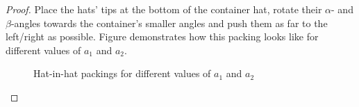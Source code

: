 \documentclass[%
    a4paper,              %
    style=screen,          %
    bibliography=totoc,   %
    nexus,                %
    lnum,                 %
    extramargin,          %
]{tubsbook}
\newcommand\defaulta{30}
\newcommand\defaultb{40}
\begin{document}
\begin{proof}
    Place the hats' tips at the bottom of the container hat, rotate their $\alpha$- and $\beta$-angles towards the container's smaller angles and push them as far to the left/right as possible. Figure  demonstrates how this packing looks like for different values of $a_1$ and $a_2$.

    \begin{figure}[htbp!]
        \centering


        \vspace{5mm}


        \vspace{5mm}


        \vspace{5mm}


        \caption{Hat-in-hat packings for different values of $a_1$ and $a_2$}
        \label{fig:hatsinhat}
    \end{figure}


\end{proof}
\end{document}
